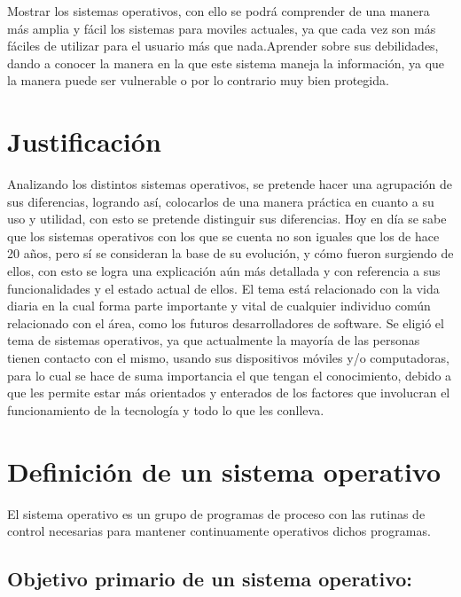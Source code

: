 \documentclass{bmcart}
\begin{document}
Mostrar los sistemas operativos, con ello se podrá comprender de una manera más amplia y fácil los sistemas para moviles actuales, ya que cada vez son más fáciles de utilizar para el usuario más que nada.Aprender sobre sus debilidades, dando a conocer la manera en la que este sistema maneja la información, ya que la manera puede ser vulnerable o por lo contrario muy bien protegida.

\section*{Justificación}

Analizando los distintos sistemas operativos, se pretende hacer una agrupación de sus diferencias, logrando así, colocarlos de una manera práctica en cuanto a su uso y utilidad, con esto se pretende distinguir sus diferencias.\newline
Hoy en día se sabe que los sistemas operativos con los que se cuenta no son iguales que los de hace 20 años, pero sí se consideran la base de su evolución, y cómo fueron surgiendo de ellos, con esto se logra una explicación aún más detallada y con referencia a sus funcionalidades y el estado actual de ellos.\newline
El tema está relacionado con la vida diaria en la cual forma parte importante y vital de cualquier individuo común relacionado con el área, como los futuros desarrolladores de software. Se eligió el tema de sistemas operativos, ya que actualmente  la mayoría de las personas tienen contacto con el mismo, usando sus dispositivos móviles y/o computadoras, para lo cual se  hace de suma importancia el que tengan el conocimiento,  debido a que  les permite estar más orientados y enterados de los factores que involucran el funcionamiento de la tecnología y todo lo que les conlleva.

\newpage

\section*{Definición de un sistema operativo}

El sistema operativo es un grupo de programas de proceso con las rutinas de
control necesarias para mantener continuamente
operativos dichos programas.

\subsection*{Objetivo primario de un sistema operativo:}
\end{document}
